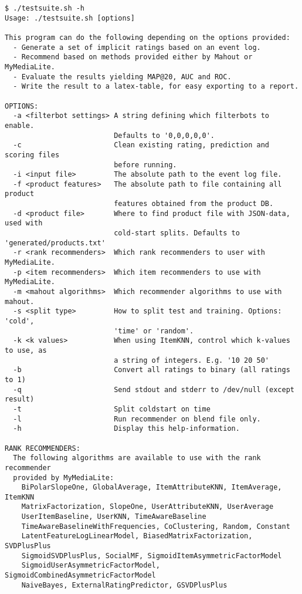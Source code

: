 \begin{lstlisting}
$ ./testsuite.sh -h
Usage: ./testsuite.sh [options]

This program can do the following depending on the options provided:
  - Generate a set of implicit ratings based on an event log.
  - Recommend based on methods provided either by Mahout or MyMediaLite.
  - Evaluate the results yielding MAP@20, AUC and ROC.
  - Write the result to a latex-table, for easy exporting to a report.

OPTIONS:
  -a <filterbot settings> A string defining which filterbots to enable.
                          Defaults to '0,0,0,0,0'.
  -c                      Clean existing rating, prediction and scoring files
                          before running.
  -i <input file>         The absolute path to the event log file.
  -f <product features>   The absolute path to file containing all product
                          features obtained from the product DB.
  -d <product file>       Where to find product file with JSON-data, used with
                          cold-start splits. Defaults to 'generated/products.txt'
  -r <rank recommenders>  Which rank recommenders to user with MyMediaLite.
  -p <item recommenders>  Which item recommenders to use with MyMediaLite.
  -m <mahout algorithms>  Which recommender algorithms to use with mahout.
  -s <split type>         How to split test and training. Options: 'cold',
                          'time' or 'random'.
  -k <k values>           When using ItemKNN, control which k-values to use, as
                          a string of integers. E.g. '10 20 50'
  -b                      Convert all ratings to binary (all ratings to 1)
  -q                      Send stdout and stderr to /dev/null (except result)
  -t                      Split coldstart on time
  -l                      Run recommender on blend file only.
  -h                      Display this help-information.

RANK RECOMMENDERS:
  The following algorithms are available to use with the rank recommender
  provided by MyMediaLite:
    BiPolarSlopeOne, GlobalAverage, ItemAttributeKNN, ItemAverage, ItemKNN
    MatrixFactorization, SlopeOne, UserAttributeKNN, UserAverage
    UserItemBaseline, UserKNN, TimeAwareBaseline
    TimeAwareBaselineWithFrequencies, CoClustering, Random, Constant
    LatentFeatureLogLinearModel, BiasedMatrixFactorization, SVDPlusPlus
    SigmoidSVDPlusPlus, SocialMF, SigmoidItemAsymmetricFactorModel
    SigmoidUserAsymmetricFactorModel, SigmoidCombinedAsymmetricFactorModel
    NaiveBayes, ExternalRatingPredictor, GSVDPlusPlus


\end{lstlisting}

